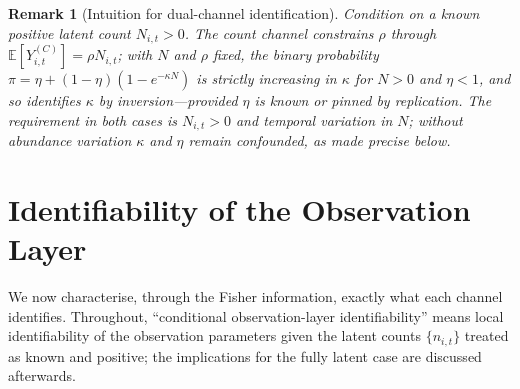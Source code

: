 \documentclass[preprint,12pt]{elsarticle}
\newtheorem{remark}{Remark}
\theoremstyle{definition}
\newcommand{\E}{\mathbb{E}}
\begin{document}
\begin{remark}[Intuition for dual-channel identification]
\label{rmk:intuition}
Condition on a known positive latent count $N_{i,t}>0$. The count channel
constrains $\rho$ through $\E[Y^{(C)}_{i,t}]=\rho N_{i,t}$; with $N$ and
$\rho$ fixed, the binary probability
$\pi=\eta+(1-\eta)(1-e^{-\kappa N})$ is strictly increasing in $\kappa$ for
$N>0$ and $\eta<1$, and so identifies $\kappa$ by inversion---provided
$\eta$ is known or pinned by replication. The requirement in both cases is
$N_{i,t}>0$ and temporal variation in $N$; without abundance variation
$\kappa$ and $\eta$ remain confounded, as made precise below.
\end{remark}

\section{Identifiability of the Observation Layer}
\label{sec:ident}

We now characterise, through the Fisher information, exactly what each
channel identifies. Throughout, ``conditional observation-layer
identifiability'' means local identifiability of the observation parameters
given the latent counts $\{n_{i,t}\}$ treated as known and positive; the
implications for the fully latent case are discussed afterwards.
\end{document}

